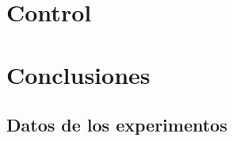 \documentclass[12pt,a4paper,twoside,openright,titlepage,final]{article}
\begin{document}
\section{Control}

\section{Conclusiones}

%
%

\begin{appendices}
	\section{Datos de los experimentos} \label{chp:experimentos}
\end{appendices}
\end{document}
